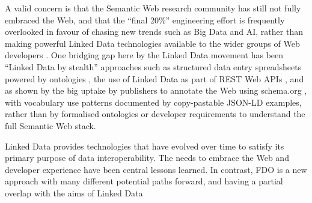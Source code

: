 A valid concern is that the Semantic Web research community has still not fully embraced the Web, and that the ``final 20\%'' engineering effort is frequently overlooked in favour of chasing new trends such as Big Data and AI, rather than making powerful Linked Data technologies available to the wider groups of Web developers \cite{verborghSemanticWebIdentity2020a}. One bridging gap here by the Linked Data movement has been ``Linked Data by stealth'' approaches such as structured data entry spreadsheets powered by ontologies \cite{wolstencroftRightFieldEmbeddingOntology2011b}, the use of Linked Data as part of REST Web APIs \cite{pageRESTLinkedData2011}, and as shown by the big uptake by publishers to annotate the Web using schema.org \cite{bernsteinNewLookSemantic2016a}, with vocabulary use patterns documented by copy-pastable JSON-LD examples, rather than by formalised ontologies or developer requirements to understand the full Semantic Web stack.

Linked Data provides technologies that have evolved over time to satisfy its primary purpose of data interoperability. The needs to embrace the Web and developer experience have been central lessons learned.  In contrast, FDO is a new approach with many different potential paths forward, and having a partial overlap with the aims of Linked Data
